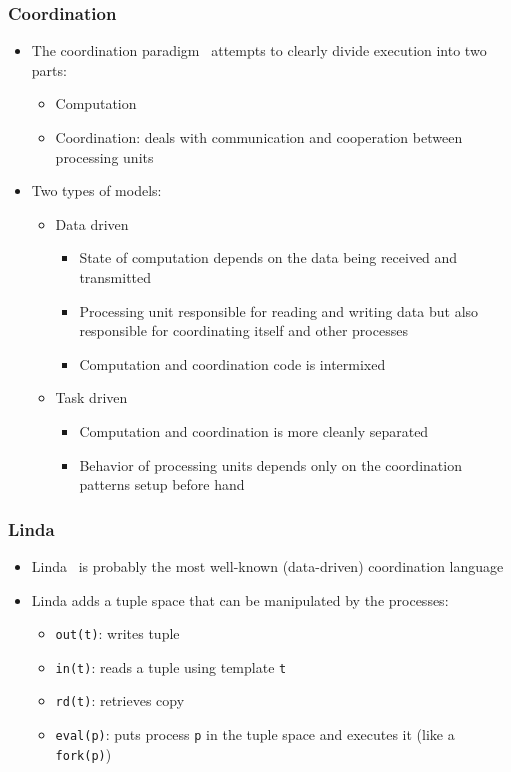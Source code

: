 \documentclass{beamer}
\begin{document}
\frame
{
   \frametitle{Coordination}
   \begin{itemize}
   \item The coordination paradigm~\cite{Papadopoulos98coordinationmodels} attempts to clearly divide execution into two parts:
   \begin{itemize}
      \item Computation
      \item Coordination: deals with communication and cooperation between processing units
   \end{itemize}
   \pause
   \item Two types of models:
   \begin{itemize}
      \item Data driven
      \begin{itemize}
         \item State of computation depends on the data being received and transmitted
         \item Processing unit responsible for reading and writing data but also responsible for coordinating itself and other processes
         \item Computation and coordination code is intermixed
      \end{itemize}
      \item Task driven
      \begin{itemize}
         \item Computation and coordination is more cleanly separated
         \item Behavior of processing units depends only on the coordination patterns setup before hand
      \end{itemize}
   \end{itemize}
\end{itemize}
}

\frame
{
   \frametitle{Linda}
   \begin{itemize}
      \item Linda~\cite{linda} is probably the most well-known (data-driven) coordination language
      \item Linda adds a tuple space that can be manipulated by the processes:
      \begin{itemize}
         \item \texttt{out(t)}: writes tuple
         \item \texttt{in(t)}: reads a tuple using template \texttt{t}
         \item \texttt{rd(t)}: retrieves copy
         \item \texttt{eval(p)}: puts process \texttt{p} in the tuple space and executes it (like a \texttt{fork(p)})
      \end{itemize}
   \end{itemize}
}
\end{document}
